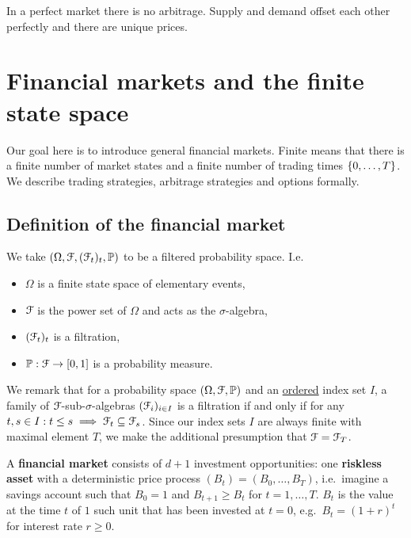 \documentclass[12pt]{amsart}
\begin{document}
In a perfect market there is no arbitrage. Supply and demand offset each other perfectly and there are unique prices.

\section{Financial markets and the finite state space}

Our goal here is to introduce general financial markets. Finite means that there is a finite number of market states and a finite number of trading times \(\left\{ 0, \dots, T \right\}\). We describe trading strategies, arbitrage strategies and options formally.

\subsection{Definition of the financial market}

We take \((\Omega, \mathcal{F}, (\mathcal{F}_t)_{t}, \mathbb{P})\) to be a filtered probability space. I.e.\
\begin{itemize}
    \item \(\Omega\) is a finite state space of elementary events,
    \item \(\mathcal{F}\) is the power set of \(\Omega\) and acts as the \(\sigma\)-algebra,
    \item \((\mathcal{F}_t)_t\) is a filtration,
    \item \(\mathbb{P}: \mathcal{F} \to [0, 1]\) is a probability measure.
\end{itemize}

\begin{remark}
    We remark that for a probability space \((\Omega, \mathcal{F}, \mathbb{P})\) and an \underline{ordered} index set \(I\), a family of \(\mathcal{F}\)-sub-\(\sigma\)-algebras \((\mathcal{F}_i)_{i \in I}\) is a filtration if and only if for any \(t, s \in I: t \leq s \implies \mathcal{F}_t \subseteq \mathcal{F}_s\). Since our index sets \(I\) are always finite with maximal element \(T\), we make the additional presumption that \(\mathcal{F} = \mathcal{F}_T\).
\end{remark}

A \textbf{financial market} consists of \(d+1\) investment opportunities: one \textbf{riskless asset} with a deterministic price process \((B_t) = (B_0, \dots, B_T)\), i.e.\ imagine a savings account such that \(B_0 = 1\) and \(B_{t+1} \geq B_t\) for \(t = 1, \dots, T\). \(B_t\) is the value at the time \(t\) of \(1\) such unit that has been invested at \(t=0\), e.g.\ \(B_t = (1+r)^t\) for interest rate \(r \geq 0\).
\end{document}
